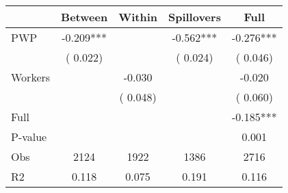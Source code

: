 
\begin{tabular}{l*{4}{c}}\hline&\multicolumn{1}{c}{Between}&\multicolumn{1}{c}{Within}&\multicolumn{1}{c}{Spillovers}&\multicolumn{1}{c}{Full}\\ \hline
 PWP           &             -0.209***      &                                               &       -0.562*** &        -0.276***                            \\ 
                               &        (       0.022)           &                                       &       (       0.024)     &      (       0.046)                                           \\ 
 Workers       &                                               &       -0.030    &                                &            -0.020                            \\ 
                               &                                               & (       0.048)                  &                                        &      (       0.060)                                           \\ 
\hline                                                                                                                                                                                                                                            
 Full                  &                                               &                                               &                                        &            -0.185***                                     \\ 
 P-value               &                                               &                                               &                                        &             0.001                                           \\ 
 Obs                   &               2124               &       1922                       &       1386                &              2716                                               \\ 
 R2                    &                      0.118              &              0.075                      &              0.191               &                     0.116                                              \\ 
\hline \end{tabular}                                                                                                                                                                                                              